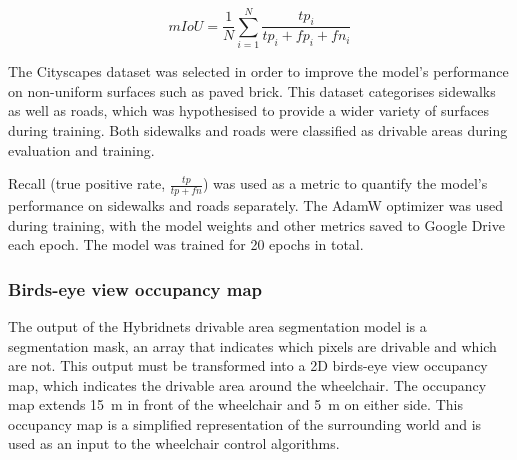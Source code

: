 \begin{equation}
mIoU = \frac{1}{N} \sum_{i=1}^{N} \frac{tp_i}{tp_i + fp_i + fn_i}
\label{eq:miou}
\end{equation}

The Cityscapes dataset was selected in order to improve the model's performance on non-uniform
surfaces such as paved brick. This dataset categorises sidewalks as well as roads,
which was hypothesised to provide a wider variety of surfaces during training.
Both sidewalks and roads were classified as drivable areas during evaluation
and training.

\pagebreak

Recall (true positive rate, $\frac{tp}{tp + fn}$) was used as a metric to quantify the model's
performance on sidewalks and roads separately.
The AdamW optimizer \cite{kingmaAdamMethodStochastic2014}\cite{loshchilovDecoupledWeightDecay2017} was
used during training, with the model weights and other metrics saved to Google Drive
each epoch. The model was trained for 20 epochs in total.


\subsubsection{Birds-eye view occupancy map}
\label{sec:birds_eye_view_occupancy_map}

The output of the Hybridnets drivable area segmentation model is a
segmentation mask, an array that indicates which pixels are drivable
and which are not.
This output must be transformed into a 2D birds-eye view occupancy map,
which indicates the drivable area around the wheelchair. The occupancy
map extends \SI{15}{\metre} in front of the wheelchair and \SI{5}{\metre} on either side.
This occupancy map is a simplified representation of the surrounding world
and is used as an input to the wheelchair control algorithms.

